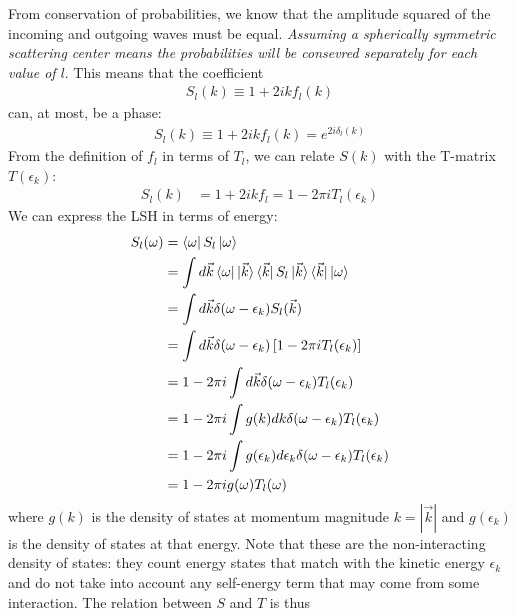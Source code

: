\documentclass[12pt,twoside]{article}
\numberwithin{equation}{section}
\begin{document}
From conservation of probabilities, we know that the amplitude squared of the incoming and outgoing waves must be equal. \textit{Assuming a spherically symmetric scattering center means the probabilities will be consevred separately for each value of \(l\)}. This means that the coefficient 
\begin{equation}\begin{aligned}
	S_l(k) \equiv 1 + 2i k f_l (k)
\end{aligned}\end{equation}
can, at most, be a phase:
\begin{equation}\begin{aligned}
	S_l (k)\equiv 1 + 2i k f_l (k) = e^{2i\delta_l(k)}
\end{aligned}\end{equation}
From the definition of \(f_l\) in terms of \(T_l\), we can relate \(S(k)\) with the T-matrix \(T(\epsilon_k)\):
\begin{equation}\begin{aligned}
	S_l(k) &= 1 + 2i k f_l = 1 - 2 \pi i T_l(\epsilon_k)
\end{aligned}\end{equation}
We can express the LSH in terms of energy:
\begin{equation}\begin{aligned}
	S_l(\omega) &= \bra{\omega}S_l\ket{\omega} \\
			   &= \int d\vec k \bra{\omega}\ket{\vec k}\bra{\vec k}S_l\ket{\vec k}\bra{\vec k}\ket{\omega}\\
			   &= \int d\vec k \delta(\omega - \epsilon_k)S_l(\vec k)\\
			   &= \int d\vec k \delta(\omega - \epsilon_k)\left[1 - 2 \pi i T_l(\epsilon_k)\right]\\
			   &= 1 - 2 \pi i \int d\vec k \delta(\omega - \epsilon_k)T_l(\epsilon_k)\\
			   &= 1 - 2 \pi i \int g(k) d k \delta(\omega - \epsilon_k)T_l(\epsilon_k)\\
			   &= 1 - 2 \pi i \int g(\epsilon_k) d \epsilon_k \delta(\omega - \epsilon_k)T_l(\epsilon_k)\\
			   &= 1 - 2 \pi i g(\omega) T_l(\omega)
\end{aligned}\end{equation}
where \(g(k)\) is the density of states at momentum magnitude \(k = |\vec k|\) and \(g(\epsilon_k)\) is the density of states at that energy. Note that these are the non-interacting density of states: they count energy states that match with the kinetic energy \(\epsilon_k\) and do not take into account any self-energy term that may come from some interaction. The relation between \(S\) and \(T\) is thus
\end{document}
